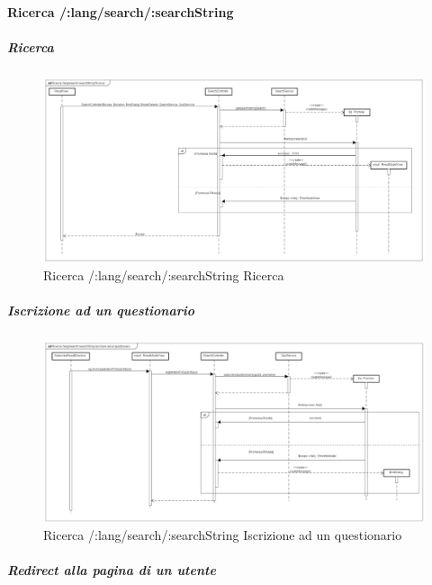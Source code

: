 \paragraph{Ricerca /:lang/search/:searchString}

\subparagraph{Ricerca}

\label{Ricerca /:lang/search/:searchString Ricerca}

\begin{figure}[ht]
	\centering
	\includegraphics[scale=0.275,keepaspectratio]{UML/DiagrammiDiSequenza/Front-End/Search.png}
	\caption{Ricerca /:lang/search/:searchString Ricerca}
\end{figure} \FloatBarrier

\subparagraph{Iscrizione ad un questionario}

\label{Ricerca /:lang/search/:searchString Iscrizione ad un questionario}

\begin{figure}[ht]
	\centering
	\includegraphics[scale=0.275,keepaspectratio]{UML/DiagrammiDiSequenza/Front-End/Search_subscribeToQuiz.png}
	\caption{Ricerca /:lang/search/:searchString Iscrizione ad un questionario}
\end{figure} \FloatBarrier

\subparagraph{Redirect alla pagina di un utente}

